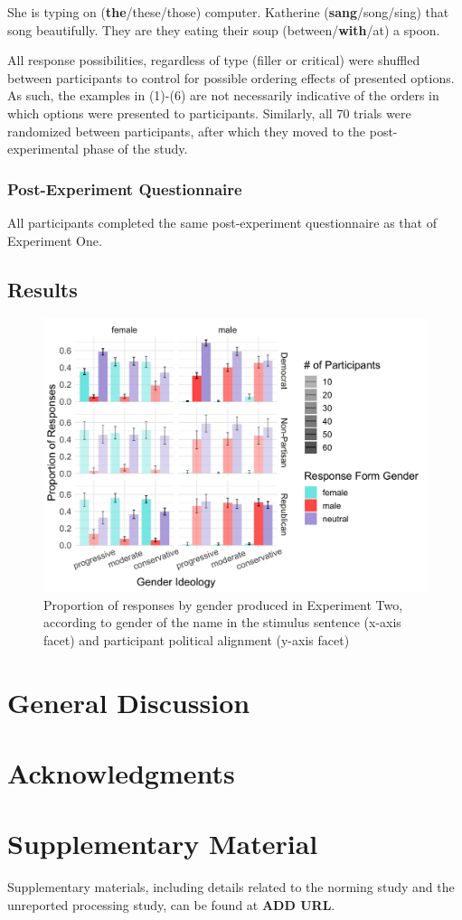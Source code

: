 \documentclass[10pt,letterpaper]{article}
\begin{document}
	\begin{exe}
		\ex She is typing on (\textbf{the}/these/those) computer.
		\ex Katherine (\textbf{sang}/song/sing) that song beautifully. 
		\ex They are they eating their soup (between/\textbf{with}/at) a spoon.
	\end{exe}
	
	All response possibilities, regardless of type (filler or critical) were shuffled between participants to control for possible ordering effects of presented options. As such, the examples in (1)-(6) are not necessarily indicative of the orders in which options were presented to participants. Similarly, all 70 trials were randomized between participants, after which they moved to the post-experimental phase of the study. 
	
	\subsubsection{Post-Experiment Questionnaire}
	All participants completed the same post-experiment questionnaire as that of Experiment One. 
	
	\subsection{Results}
	
	\begin{figure}[h]
		\includegraphics[scale=0.115]{prod-3x2x3.png}
		\caption{Proportion of responses by gender produced in Experiment Two, according to gender of the name in the stimulus sentence (x-axis facet) and participant political alignment (y-axis facet)}
	\end{figure}
	
	\section{General Discussion}
	
	\section{Acknowledgments}
	
	\section{Supplementary Material}
	Supplementary materials, including details related to the norming study and the unreported processing study, can be found at \textbf{ADD URL}.
	
	
	\printbibliography
	
	
	
\end{document}
